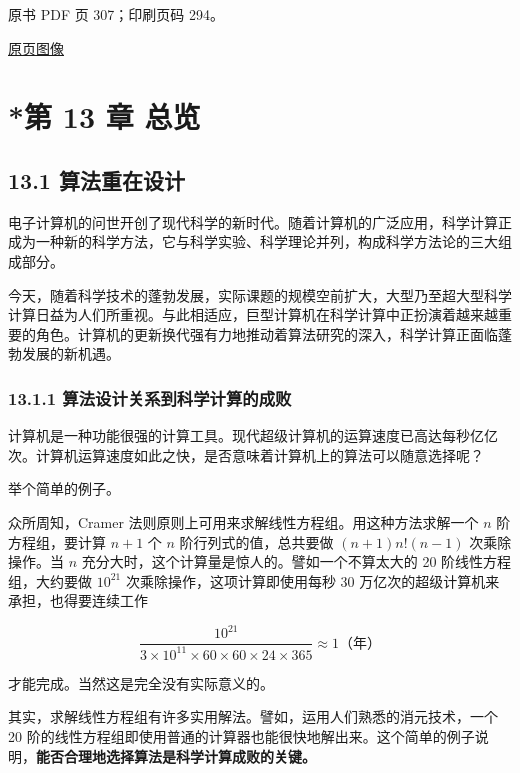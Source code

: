 \clearpage

原书 PDF 页 307；印刷页码 294。

\href{source-images/pdf-307.jpeg}{原页图像}

\section{*第 13 章 总览}\label{ch13-ux7b2c-13-ux7ae0-ux603bux89c8}

\subsection{13.1 算法重在设计}\label{ch13-ux7b97ux6cd5ux91cdux5728ux8bbeux8ba1}

电子计算机的问世开创了现代科学的新时代。随着计算机的广泛应用，科学计算正成为一种新的科学方法，它与科学实验、科学理论并列，构成科学方法论的三大组成部分。

今天，随着科学技术的蓬勃发展，实际课题的规模空前扩大，大型乃至超大型科学计算日益为人们所重视。与此相适应，巨型计算机在科学计算中正扮演着越来越重要的角色。计算机的更新换代强有力地推动着算法研究的深入，科学计算正面临蓬勃发展的新机遇。

\subsubsection{13.1.1 算法设计关系到科学计算的成败}\label{ch13-ux7b97ux6cd5ux8bbeux8ba1ux5173ux7cfbux5230ux79d1ux5b66ux8ba1ux7b97ux7684ux6210ux8d25}

计算机是一种功能很强的计算工具。现代超级计算机的运算速度已高达每秒亿亿次。计算机运算速度如此之快，是否意味着计算机上的算法可以随意选择呢？

举个简单的例子。

众所周知，Cramer 法则原则上可用来求解线性方程组。用这种方法求解一个 \(n\) 阶方程组，要计算 \(n+1\) 个 \(n\) 阶行列式的值，总共要做 \((n+1)n!(n-1)\) 次乘除操作。当 \(n\) 充分大时，这个计算量是惊人的。譬如一个不算太大的 20 阶线性方程组，大约要做 \(10^{21}\) 次乘除操作，这项计算即使用每秒 30 万亿次的超级计算机来承担，也得要连续工作

\[
\frac{10^{21}}{3\times10^{11}\times60\times60\times24\times365}\approx1\text{（年）}
\]

才能完成。当然这是完全没有实际意义的。

其实，求解线性方程组有许多实用解法。譬如，运用人们熟悉的消元技术，一个 20 阶的线性方程组即使用普通的计算器也能很快地解出来。这个简单的例子说明，\textbf{能否合理地选择算法是科学计算成败的关键。}

